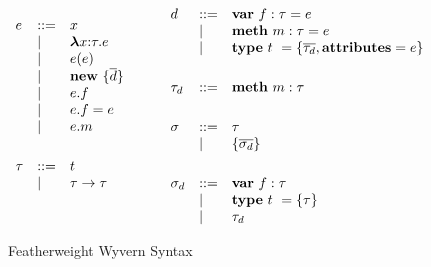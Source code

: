 \begin{figure}
\centering
\[
\begin{array}{lll}

e    & ::= & x \\
     & \mathrel{\mid} & \boldsymbol\lambda x{:}\tau . e \\
     & \mathrel{\mid} & e(e) \\
     & \mathrel{\mid} & \textbf{new}~ \{ \overline{d} \}\\
     & \mathrel{\mid} & e.f \\
     & \mathrel{\mid} & e.f = e \\
     & \mathrel{\mid} & e.m \\
\\[1ex]

\tau & ::= & t\\
     & \mathrel{\mid} & \tau \rightarrow \tau \\
\\[1ex]
	 
\end{array}
\begin{array}{lll}
~~~~
\end{array}
\begin{array}{lll}
	 
d   & ::= & \textbf{var}~ f:\tau = e \\
     & \mathrel{\mid} & \textbf{meth}~ m:\tau = e \\
     & \mathrel{\mid} & \textbf{type}~ t~ = \{ \overline{\tau_d}, \textbf{attributes}=e \} \\
\\[1ex]

\tau_d   & ::= & \textbf{meth}~ m:\tau \\
\\[1ex]

\sigma & ::= & \tau \\
       & \mathrel{\mid} & \{ \overline{\sigma_d} \} \\
\\[1ex]

\sigma_d & ::= & \textbf{var}~ f:\tau \\
         & \mathrel{\mid} & \textbf{type}~ t~ = \{ \tau \}  \\
         & \mathrel{\mid} & \tau_d \\

\end{array}
\]
\caption{Featherweight Wyvern Syntax}
\label{fig:core2-syntax}
\end{figure}
